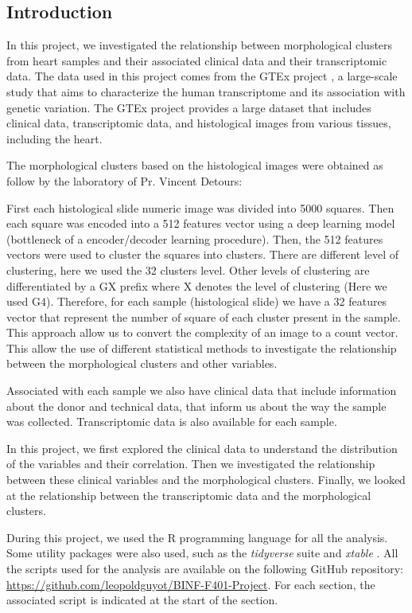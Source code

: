 \documentclass[a4paper, 11pt]{article}
\begin{document}
\begin{multicols}{2}

\section*{Introduction}
In this project, we investigated the relationship between morphological clusters from heart samples and their associated clinical data and their transcriptomic data.
The data used in this project comes from the GTEx project \citep{lonsdale2013genotype}, a large-scale study that aims to characterize the human transcriptome and its association with genetic variation.
The GTEx project provides a large dataset that includes clinical data, transcriptomic data, and histological images from various tissues, including the heart.

The morphological clusters based on the histological images were obtained as follow by the laboratory of Pr. Vincent Detours: 

First each histological slide numeric image was divided into 5000 squares.
Then each square was encoded into a 512 features vector using a deep learning model (bottleneck of a encoder/decoder learning procedure). 
Then, the 512 features vectors were used to cluster the squares into clusters. 
There are different level of clustering, here we used the 32 clusters level.
Other levels of clustering are differentiated by a GX prefix where X denotes the level of clustering (Here we used G4).
Therefore, for each sample (histological slide) we have a 32 features vector that represent the number of square of each cluster present in the sample.
This approach allow us to convert the complexity of an image to a count vector. 
This allow the use of different statistical methods to investigate the relationship between the morphological clusters and other variables.

Associated with each sample we also have clinical data that include information about the donor and technical data, that inform us about the way the sample was collected.
Transcriptomic data is also available for each sample. 

In this project, we first explored the clinical data to understand the distribution of the variables and their correlation.
Then we investigated the relationship between these clinical variables and the morphological clusters.
Finally, we looked at the relationship between the transcriptomic data and the morphological clusters.

During this project, we used the R programming language \citep{R:2024} for all the analysis. Some utility packages were also used, such as the \textit{tidyverse} suite \citep{tidyverse} and \textit{xtable} \citep{xtable}.
All the scripts used for the analysis are available on the following GitHub repository: \url{https://github.com/leopoldguyot/BINF-F401-Project}.
For each section, the associated script is indicated at the start of the section.


\end{multicols}
\end{document}
